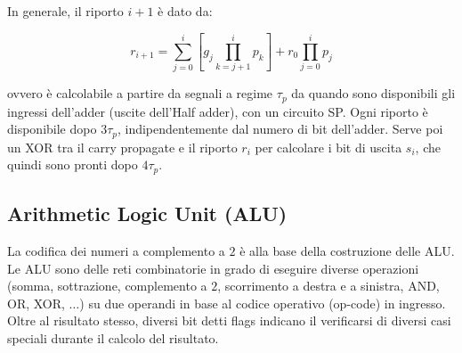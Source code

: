 \documentclass{subfiles}
\begin{document}
\noindent
In generale, il riporto $i+1$ è dato da:

$$
r_{i+1} = \sum^{i}_{j=0} [g_j \prod^{i}_{k=j+1} p_k] + r_0 \prod^{i}_{j=0} p_j
$$

\noindent
ovvero è calcolabile a partire da segnali a regime $\tau_p$ da quando sono disponibili gli ingressi dell'adder (uscite dell'Half adder), con un circuito SP.
Ogni riporto è disponibile dopo $3\tau_p$, indipendentemente dal numero di bit dell'adder.
Serve poi un XOR tra il carry propagate e il riporto $r_i$ per calcolare i bit di uscita $s_i$, che quindi sono pronti dopo $4\tau_p$.

\subsection{Arithmetic Logic Unit (ALU)}

La codifica dei numeri a complemento a $2$ è alla base della costruzione delle ALU.
Le ALU sono delle reti combinatorie in grado di eseguire diverse operazioni (somma, sottrazione, complemento a $2$, scorrimento a destra e a sinistra, AND, OR, XOR, $\dots$) su due operandi in base al codice operativo (op-code) in ingresso.
Oltre al risultato stesso, diversi bit detti flags indicano il verificarsi di diversi casi speciali durante il calcolo del risultato.
\end{document}

